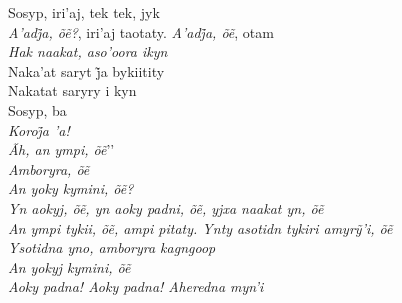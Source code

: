\begin{linenumbers}\begingroup\raggedright

\noindent   Sosyp, iri'aj, tek tek, jyk\\
  \emph{A’adj̃a, õẽ?}, iri’aj taotaty. \emph{A’adj̃a, õẽ}, otam\\
  \emph{Hak naakat, aso'oora ikyn}\\
  Naka’at saryt j̃a bykiitity\\
  Nakatat saryry i kyn\\
  Sosyp, ba\\
  \emph{Koroj̃a ’a!}\\
  \emph{Ãh, an ympi, õẽ}’’\\
  \emph{Amboryra, õẽ}\\
  \emph{An yoky kymini, õẽ?}\\
  \emph{Yn aokyj, õẽ, yn aoky padni, õẽ, yjxa naakat yn, õẽ}\\
  \emph{An ympi tykii, õẽ, ampi pitaty. Ynty asotidn tykiri amyrỹ’i, õẽ}\\
  \emph{Ysotidna yno, amboryra kagngoop}\\
  \emph{An yokyj kymini, õẽ}\\
  \emph{Aoky padna! Aoky padna! Aheredna myn'i}

\end{linenumbers}\endgroup

